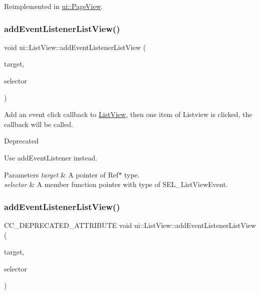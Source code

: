 Reimplemented in \hyperlink{classui_1_1PageView_a8887593dc71c203af06f8043082d2de4}{ui\+::\+Page\+View}.

\mbox{\label{classui_1_1ListView_a556eebb13ecb5dd706023857477c4b46}} 
\subsubsection{\texorpdfstring{add\+Event\+Listener\+List\+View()}{addEventListenerListView()}\hspace{0.1cm}{\footnotesize\ttfamily [1/2]}}
{\footnotesize\ttfamily void ui\+::\+List\+View\+::add\+Event\+Listener\+List\+View (\begin{DoxyParamCaption}\item[{\hyperlink{classRef}{Ref} $\ast$}]{target,  }\item[{S\+E\+L\+\_\+\+List\+View\+Event}]{selector }\end{DoxyParamCaption})}

Add an event click callback to \hyperlink{classui_1_1ListView}{List\+View}, then one item of Listview is clicked, the callback will be called. \begin{DoxyRefDesc}{Deprecated}
\item[\hyperlink{deprecated__deprecated000145}{Deprecated}]Use {\ttfamily add\+Event\+Listener} instead. \end{DoxyRefDesc}

\begin{DoxyParams}{Parameters}
{\em target} & A pointer of {\ttfamily Ref$\ast$} type. \\
\hline
{\em selector} & A member function pointer with type of {\ttfamily S\+E\+L\+\_\+\+List\+View\+Event}. \\
\hline
\end{DoxyParams}
\mbox{\label{classui_1_1ListView_ad2a7ee403cd9f7559f99e34046c1a8bb}} 
\subsubsection{\texorpdfstring{add\+Event\+Listener\+List\+View()}{addEventListenerListView()}\hspace{0.1cm}{\footnotesize\ttfamily [2/2]}}
{\footnotesize\ttfamily C\+C\+\_\+\+D\+E\+P\+R\+E\+C\+A\+T\+E\+D\+\_\+\+A\+T\+T\+R\+I\+B\+U\+TE void ui\+::\+List\+View\+::add\+Event\+Listener\+List\+View (\begin{DoxyParamCaption}\item[{\hyperlink{classRef}{Ref} $\ast$}]{target,  }\item[{S\+E\+L\+\_\+\+List\+View\+Event}]{selector }\end{DoxyParamCaption})}

